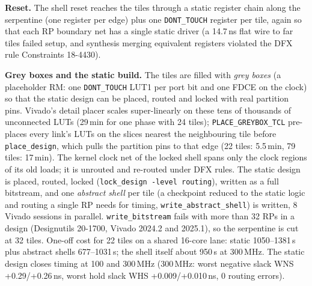 \documentclass[10pt,twocolumn]{article}
\newcommand{\code}[1]{\texttt{\small #1}}
\begin{document}
\textbf{Reset.} The shell reset reaches the tiles through a static register chain along the
serpentine (one register per edge) plus one \code{DONT\_TOUCH} register per tile, again so that
each RP boundary net has a single static driver (a 14.7\,ns flat wire to far tiles failed setup,
and synthesis merging equivalent registers violated the DFX rule Constraints 18-4430).

\textbf{Grey boxes and the static build.} The tiles are filled with \emph{grey boxes} (a
placeholder RM: one \code{DONT\_TOUCH} LUT1 per port bit and one FDCE on the clock) so that the
static design can be placed, routed and locked with real partition pins. Vivado's detail placer
scales super-linearly on these tens of thousands of unconnected LUTs (29\,min for one phase with
24 tiles); \code{PLACE\_GREYBOX\_TCL} pre-places every link's LUTs on the slices nearest the
neighbouring tile before \code{place\_design}, which pulls the partition pins to that edge
(22 tiles: 5.5\,min, 79 tiles: 17\,min). The kernel clock net of the locked shell spans only the
clock regions of its old loads; it is unrouted and re-routed under DFX rules. The static design is
placed, routed, locked (\code{lock\_design -level routing}), written as a full bitstream, and one
\emph{abstract shell} per tile (a checkpoint reduced to the static logic and routing a single RP
needs for timing, \code{write\_abstract\_shell}) is written, 8 Vivado sessions in parallel.
\code{write\_bitstream} fails with more than 32 RPs in a design (Designutils 20-1700, Vivado
2024.2 and 2025.1), so the serpentine is cut at 32 tiles. One-off cost for 22 tiles on a shared
16-core lane: static 1050--1381\,s plus abstract shells 677--1031\,s; the shell itself about
950\,s at 300\,MHz. The static design closes timing at 100 and 300\,MHz (300\,MHz: worst
negative slack WNS +0.29/+0.26\,ns, worst hold slack WHS +0.009/+0.010\,ns, 0 routing errors).
\end{document}
